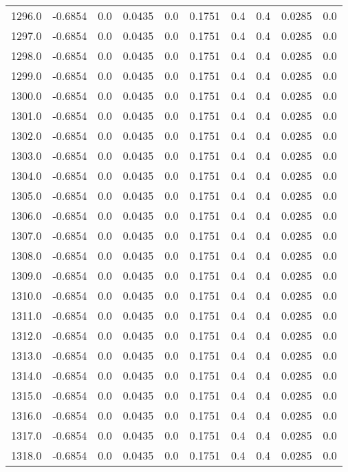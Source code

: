 \begin{longtable}{lrrrrrrrrr}
1296.0 & -0.6854 & 0.0 & 0.0435 & 0.0 & 0.1751 & 0.4 & 0.4 & 0.0285 & 0.0 \\
1297.0 & -0.6854 & 0.0 & 0.0435 & 0.0 & 0.1751 & 0.4 & 0.4 & 0.0285 & 0.0 \\
1298.0 & -0.6854 & 0.0 & 0.0435 & 0.0 & 0.1751 & 0.4 & 0.4 & 0.0285 & 0.0 \\
1299.0 & -0.6854 & 0.0 & 0.0435 & 0.0 & 0.1751 & 0.4 & 0.4 & 0.0285 & 0.0 \\
1300.0 & -0.6854 & 0.0 & 0.0435 & 0.0 & 0.1751 & 0.4 & 0.4 & 0.0285 & 0.0 \\
1301.0 & -0.6854 & 0.0 & 0.0435 & 0.0 & 0.1751 & 0.4 & 0.4 & 0.0285 & 0.0 \\
1302.0 & -0.6854 & 0.0 & 0.0435 & 0.0 & 0.1751 & 0.4 & 0.4 & 0.0285 & 0.0 \\
1303.0 & -0.6854 & 0.0 & 0.0435 & 0.0 & 0.1751 & 0.4 & 0.4 & 0.0285 & 0.0 \\
1304.0 & -0.6854 & 0.0 & 0.0435 & 0.0 & 0.1751 & 0.4 & 0.4 & 0.0285 & 0.0 \\
1305.0 & -0.6854 & 0.0 & 0.0435 & 0.0 & 0.1751 & 0.4 & 0.4 & 0.0285 & 0.0 \\
1306.0 & -0.6854 & 0.0 & 0.0435 & 0.0 & 0.1751 & 0.4 & 0.4 & 0.0285 & 0.0 \\
1307.0 & -0.6854 & 0.0 & 0.0435 & 0.0 & 0.1751 & 0.4 & 0.4 & 0.0285 & 0.0 \\
1308.0 & -0.6854 & 0.0 & 0.0435 & 0.0 & 0.1751 & 0.4 & 0.4 & 0.0285 & 0.0 \\
1309.0 & -0.6854 & 0.0 & 0.0435 & 0.0 & 0.1751 & 0.4 & 0.4 & 0.0285 & 0.0 \\
1310.0 & -0.6854 & 0.0 & 0.0435 & 0.0 & 0.1751 & 0.4 & 0.4 & 0.0285 & 0.0 \\
1311.0 & -0.6854 & 0.0 & 0.0435 & 0.0 & 0.1751 & 0.4 & 0.4 & 0.0285 & 0.0 \\
1312.0 & -0.6854 & 0.0 & 0.0435 & 0.0 & 0.1751 & 0.4 & 0.4 & 0.0285 & 0.0 \\
1313.0 & -0.6854 & 0.0 & 0.0435 & 0.0 & 0.1751 & 0.4 & 0.4 & 0.0285 & 0.0 \\
1314.0 & -0.6854 & 0.0 & 0.0435 & 0.0 & 0.1751 & 0.4 & 0.4 & 0.0285 & 0.0 \\
1315.0 & -0.6854 & 0.0 & 0.0435 & 0.0 & 0.1751 & 0.4 & 0.4 & 0.0285 & 0.0 \\
1316.0 & -0.6854 & 0.0 & 0.0435 & 0.0 & 0.1751 & 0.4 & 0.4 & 0.0285 & 0.0 \\
1317.0 & -0.6854 & 0.0 & 0.0435 & 0.0 & 0.1751 & 0.4 & 0.4 & 0.0285 & 0.0 \\
1318.0 & -0.6854 & 0.0 & 0.0435 & 0.0 & 0.1751 & 0.4 & 0.4 & 0.0285 & 0.0 \\

\end{longtable}
